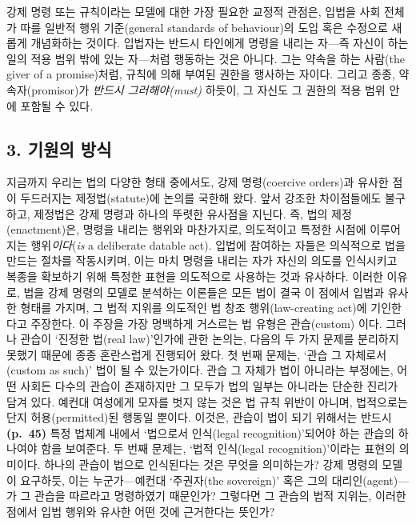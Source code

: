\documentclass[12pt, oneside]{book}  %
\begin{document}
강제 명령 또는 규칙이라는 모델에 대한 가장 필요한 교정적 관점은, 입법을
사회 전체가 따를 일반적 행위 기준(general standards of behaviour)의 도입
혹은 수정으로 새롭게 개념화하는 것이다. 입법자는 반드시 타인에게 명령을
내리는 자---즉 자신이 하는 일의 적용 범위 밖에 있는 자---처럼 행동하는
것은 아니다. 그는 약속을 하는 사람(the giver of a promise)처럼, 규칙에
의해 부여된 권한을 행사하는 자이다. 그리고 종종, 약속자(promisor)가
\emph{반드시 그러해야(must)} 하듯이, 그 자신도 그 권한의 적용 범위 안에
포함될 수 있다.

\subsection{\texorpdfstring{\textbf{3. 기원의
방식}}{3. 기원의 방식}}\label{uxae30uxc6d0uxc758-uxbc29uxc2dd}

지금까지 우리는 법의 다양한 형태 중에서도, 강제 명령(coercive orders)과
유사한 점이 두드러지는 제정법(statute)에 논의를 국한해 왔다. 앞서 강조한
차이점들에도 불구하고, 제정법은 강제 명령과 하나의 뚜렷한 유사점을
지닌다. 즉, 법의 제정(enactment)은, 명령을 내리는 행위와 마찬가지로,
의도적이고 특정한 시점에 이루어지는 행위\emph{이다}(\emph{is} a
deliberate datable act). 입법에 참여하는 자들은 의식적으로 법을 만드는
절차를 작동시키며, 이는 마치 명령을 내리는 자가 자신의 의도를 인식시키고
복종을 확보하기 위해 특정한 표현을 의도적으로 사용하는 것과 유사하다.
이러한 이유로, 법을 강제 명령의 모델로 분석하는 이론들은 모든 법이 결국
이 점에서 입법과 유사한 형태를 가지며, 그 법적 지위를 의도적인 법 창조
행위(law-creating act)에 기인한다고 주장한다. 이 주장을 가장 명백하게
거스르는 법 유형은 관습(custom) 이다. 그러나 관습이 `진정한 법(real
law)'인가에 관한 논의는, 다음의 두 가지 문제를 분리하지 못했기 때문에
종종 혼란스럽게 진행되어 왔다. 첫 번째 문제는, `관습 그 자체로서(custom
as such)' 법이 될 수 있는가이다. 관습 그 자체가 법이 아니라는 부정에는,
어떤 사회든 다수의 관습이 존재하지만 그 모두가 법의 일부는 아니라는
단순한 진리가 담겨 있다. 예컨대 여성에게 모자를 벗지 않는 것은 법 규칙
위반이 아니며, 법적으로는 단지 허용(permitted)된 행동일 뿐이다. 이것은,
관습이 법이 되기 위해서는 반드시 \textbf{(p.~45)} 특정 법체계 내에서
`법으로서 인식(legal recognition)'되어야 하는 관습의 하나여야 함을
보여준다. 두 번째 문제는, `법적 인식(legal recognition)'이라는 표현의
의미이다. 하나의 관습이 법으로 인식된다는 것은 무엇을 의미하는가? 강제
명령의 모델이 요구하듯, 이는 누군가---예컨대 `주권자(the sovereign)'
혹은 그의 대리인(agent)---가 그 관습을 따르라고 명령하였기 때문인가?
그렇다면 그 관습의 법적 지위는, 이러한 점에서 입법 행위와 유사한 어떤
것에 근거한다는 뜻인가?
\end{document}
